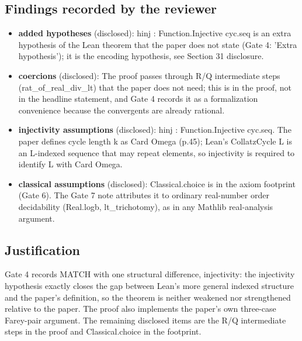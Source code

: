 \documentclass[11pt]{article}
\begin{document}
\subsection*{Findings recorded by the reviewer}
\begin{itemize}
\item \textbf{added hypotheses} (disclosed): hinj : Function.Injective cyc.seq is an extra hypothesis of the Lean theorem that the paper does not state (Gate 4: 'Extra hypothesis'); it is the encoding hypothesis, see Section 31 disclosure.
\item \textbf{coercions} (disclosed): The proof passes through R/Q intermediate steps (rat\_of\_real\_div\_lt) that the paper does not need; this is in the proof, not in the headline statement, and Gate 4 records it as a formalization convenience because the convergents are already rational.
\item \textbf{injectivity assumptions} (disclosed): hinj : Function.Injective cyc.seq. The paper defines cycle length k as Card Omega (p.45); Lean's CollatzCycle L is an L-indexed sequence that may repeat elements, so injectivity is required to identify L with Card Omega.
\item \textbf{classical assumptions} (disclosed): Classical.choice is in the axiom footprint (Gate 6). The Gate 7 note attributes it to ordinary real-number order decidability (Real.logb, lt\_trichotomy), as in any Mathlib real-analysis argument.
\end{itemize}
\subsection*{Justification}
Gate 4 records MATCH with one structural difference, injectivity: the injectivity hypothesis exactly closes the gap between Lean's more general indexed structure and the paper's definition, so the theorem is neither weakened nor strengthened relative to the paper. The proof also implements the paper's own three-case Farey-pair argument. The remaining disclosed items are the R/Q intermediate steps in the proof and Classical.choice in the footprint.
\end{document}
